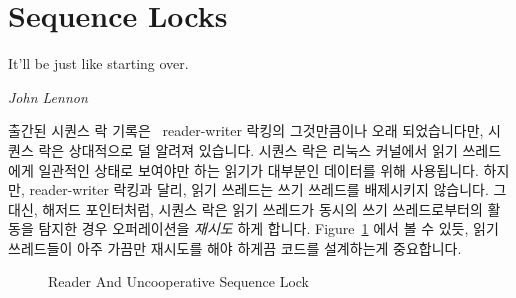 
\section{Sequence Locks}
\label{sec:defer:Sequence Locks}
%
\epigraph{It'll be just like starting over.}{\emph{John Lennon}}

출간된 시퀀스 락 기록은~\cite{10.1145/800212.806505,10.1145/359863.359878}
reader-writer 락킹의 그것만큼이나 오래 되었습니다만, 시퀀스 락은 상대적으로 덜
알려져 있습니다.
시퀀스 락은 리눅스 커널에서 읽기 쓰레드에게 일관적인 상태로 보여야만 하는
읽기가 대부분인 데이터를 위해 사용됩니다.
하지만, reader-writer 락킹과 달리, 읽기 쓰레드는 쓰기 쓰레드를 배제시키지
않습니다.
그 대신, 해저드 포인터처럼, 시퀀스 락은 읽기 쓰레드가 동시의 쓰기
쓰레드로부터의 활동을 탐지한 경우 오퍼레이션을 \emph{재시도} 하게 합니다.
Figure~\ref{fig:defer:Reader And Uncooperative Sequence Lock}
에서 볼 수 있듯, 읽기 쓰레드들이 아주 가끔만 재시도를 해야 하게끔 코드를
설계하는게 중요합니다.

\begin{figure}[tb]
\centering
{}
\caption{Reader And Uncooperative Sequence Lock}
\label{fig:defer:Reader And Uncooperative Sequence Lock}
\end{figure}

